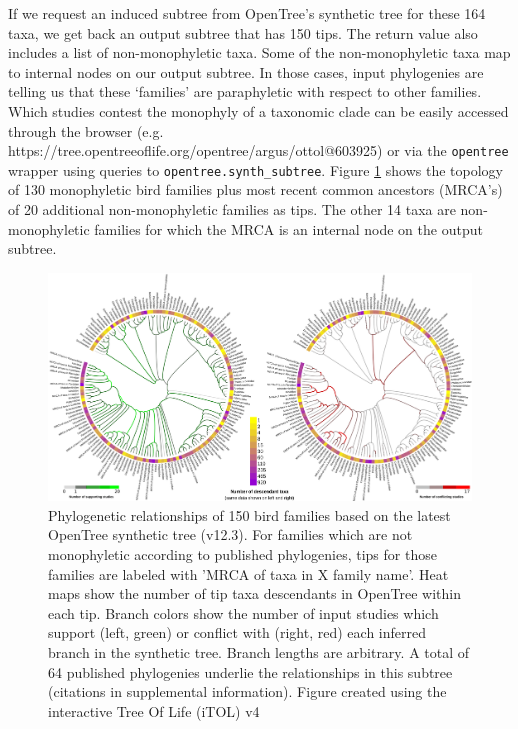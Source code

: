 \documentclass[oupdraft]{sysbio_sse}
\begin{document}
If we request an induced subtree from OpenTree's synthetic tree for these 164 taxa, we get back an output subtree that has 150 tips. The return value also includes a list of non-monophyletic taxa.
Some of the non-monophyletic taxa map to internal nodes on our output subtree. In those cases, input phylogenies are telling us that these `families' are paraphyletic with respect to other families. Which studies contest the monophyly of a taxonomic clade can be easily accessed through the browser (e.g. https://tree.opentreeoflife.org/opentree/argus/ottol@603925) or via the \texttt{opentree} wrapper using queries to \texttt{opentree.synth\_subtree}. Figure \ref{birdfams} shows the topology of 130 monophyletic bird families plus most recent common ancestors (MRCA's) of 20 additional non-monophyletic families as tips. The other 14 taxa are non-monophyletic families for which the MRCA is an internal node on the output subtree.


\begin{figure}[!h]
\centering\includegraphics[width=\textwidth]{bird_fam_fig_rev}

\caption{Phylogenetic relationships of 150 bird families based on the latest OpenTree synthetic tree (v12.3). For families which are not monophyletic according to published phylogenies, tips for those families are labeled with 'MRCA of taxa in X family name'. Heat maps show the number of tip taxa descendants in OpenTree within each tip. Branch colors show the number of input studies which support (left, green) or conflict with (right, red) each inferred branch in the synthetic tree. Branch lengths are arbitrary. A total of 64 published phylogenies underlie the relationships in this subtree (citations in supplemental information). Figure created using the interactive Tree Of Life (iTOL) v4 \citep{letunic_interactive_2019}}
\label{birdfams}
\end{figure}
\end{document}
